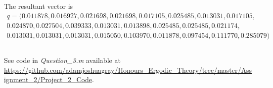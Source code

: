 \documentclass{unswmaths}
\begin{document}
The resultant vector is
\begin{align*}    q =
(  0.011878,
   0.016927,
   0.021698,
   0.021698,
   0.017105,
   0.025485,
   0.013031,
   0.017105, \\
   0.024870,
   0.027504,
   0.039333,
   0.013031,
   0.013898,
   0.025485,
   0.025485,
   0.021174, \\
   0.013031,
   0.013031,
   0.013031,
   0.015050,
   0.103970,
   0.011878,
   0.097454,
   0.111770,
   0.285079
)
\end{align*}
\subsection{}
See code in \emph{Question\_3.m} available at \url{https://github.com/adamjoshuagray/Honours_Ergodic_Theory/tree/master/Assignment_2/Project_2_Code}. 
\end{document}
